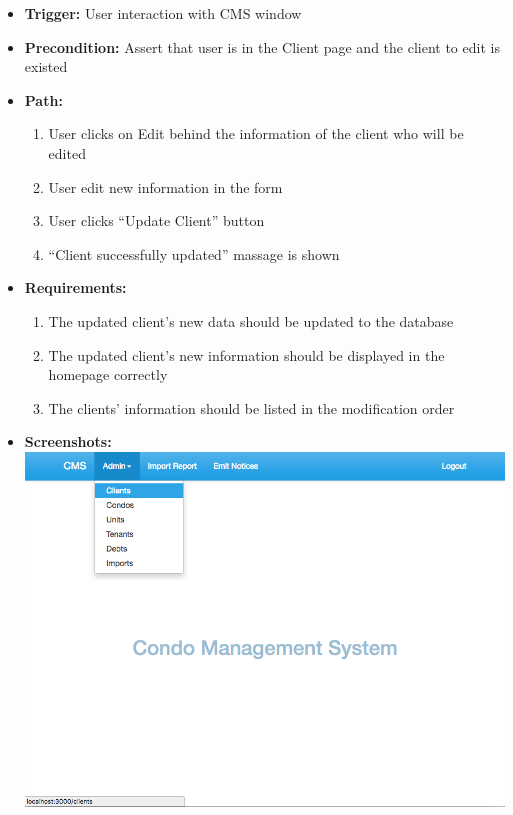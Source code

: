\begin{itemize}
  \item[] \textbf{Trigger:} User interaction with CMS window
  \item[] \textbf{Precondition:} Assert that user is in the Client page and the client to edit is existed
  \item[] \textbf{Path:}
    \begin{enumerate}
      \item User clicks on Edit behind the information of the client who will be edited
      \item User edit new information in the form
      \item User clicks ``Update Client'' button
      \item ``Client successfully updated'' massage is shown
    \end{enumerate}
  \item[] \textbf{Requirements:}
    \begin{enumerate}
      \item The updated client’s new data should be updated to the database
      \item The updated client’s new information should be displayed in the homepage correctly
      \item The clients’ information should be listed in the modification order
    \end{enumerate}
  \item[] \textbf{Screenshots:}\\
    \includegraphics[scale=0.25]{./images/ss/client/edit/1.png}

\end{itemize}
